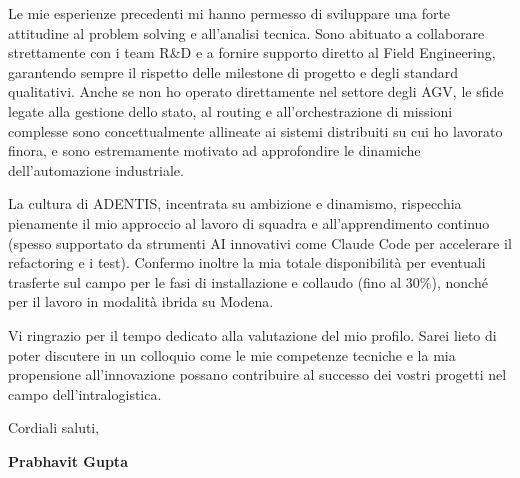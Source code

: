 \documentclass[11pt,a4paper]{article}
\begin{document}
\vspace{0.3cm}

\noindent
Le mie esperienze precedenti mi hanno permesso di sviluppare una forte attitudine al problem solving e all'analisi tecnica. Sono abituato a collaborare strettamente con i team R\&D e a fornire supporto diretto al Field Engineering, garantendo sempre il rispetto delle milestone di progetto e degli standard qualitativi. Anche se non ho operato direttamente nel settore degli AGV, le sfide legate alla gestione dello stato, al routing e all'orchestrazione di missioni complesse sono concettualmente allineate ai sistemi distribuiti su cui ho lavorato finora, e sono estremamente motivato ad approfondire le dinamiche dell'automazione industriale.

\vspace{0.3cm}

\noindent
La cultura di ADENTIS, incentrata su ambizione e dinamismo, rispecchia pienamente il mio approccio al lavoro di squadra e all'apprendimento continuo (spesso supportato da strumenti AI innovativi come Claude Code per accelerare il refactoring e i test). Confermo inoltre la mia totale disponibilità per eventuali trasferte sul campo per le fasi di installazione e collaudo (fino al 30\%), nonché per il lavoro in modalità ibrida su Modena.

\vspace{0.3cm}

\noindent
Vi ringrazio per il tempo dedicato alla valutazione del mio profilo. Sarei lieto di poter discutere in un colloquio come le mie competenze tecniche e la mia propensione all'innovazione possano contribuire al successo dei vostri progetti nel campo dell'intralogistica.

\vspace{0.5cm}

\noindent
Cordiali saluti,

\vspace{0.5cm}

\noindent
\textbf{Prabhavit Gupta}
\end{document}

